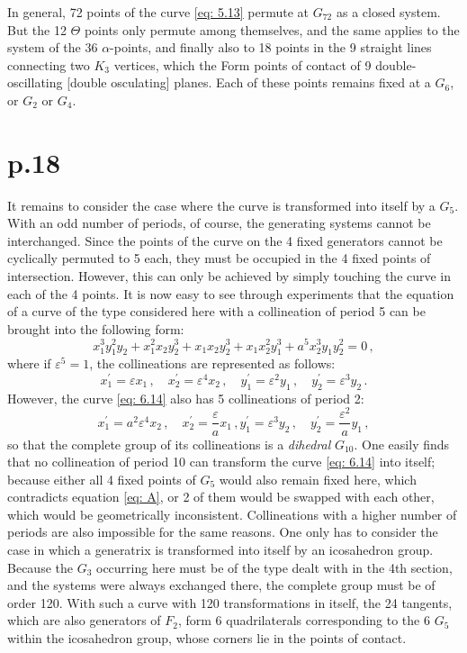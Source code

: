 \documentclass[leqno]{article}
\begin{document}
In general, 72 points of the curve \eqref{eq: 5.13} permute at $G_{72}$ as a closed system. But the 12 $\Theta$ points only permute among themselves, and the same applies to the system of the 36 $\alpha$-points, and finally also to 18 points in the 9 straight lines connecting two $K_3$ vertices, which the Form points of contact of 9 double-oscillating [double osculating] planes. Each of these points remains fixed at a $G_6$, or $G_2$ or $G_4$. 
\section{p.18}
It remains to consider the case where the curve is transformed into itself by a $G_5$. With an odd number of periods, of course, the generating systems cannot be interchanged. Since the points of the curve on the 4 fixed generators cannot be cyclically permuted to 5 each, they must be occupied in the 4 fixed points of intersection. However, this can only be achieved by simply touching the curve in each of the 4 points. It is now easy to see through experiments that the equation of a curve of the type considered here with a collineation of period 5 can be brought into the following form: 
\begin{equation}\label{eq: 6.14}
x_1^3 y_1^2 y_2 + x_1^2 x_2 y_2^3 + x_1 x_2 y_2^3 + x_1 x_2^2 y_1^3 + a^5 x_2^3 y_1 y_2^2 = 0 \, , \tag{14}
\end{equation}
where if $\varepsilon^5=1 $, the collineations are represented as follows:
\[
x_1^\prime = \varepsilon x_1 \, , \quad x_2^\prime = \varepsilon^4 x_2 \, , \quad y_1^\prime = \varepsilon^2 y_1 \, , \quad y_2^\prime = \varepsilon^3 y_2 \, . 
\]
However, the curve \eqref{eq: 6.14} also has 5 collineations of period 2: 
\[
x_1^\prime = a^2 \varepsilon^4 x_2 \, , \quad x_2^\prime = \frac{\varepsilon}{a} x_1 \, , y_1^\prime = \varepsilon^3 y_2 \, , \quad y_2^\prime = \frac{\varepsilon^2}{a} y_1 \, , 
\]
so that the complete group of its collineations is a \textit{dihedral} $G_{10}$. One easily finds that no collineation of period 10 can transform the curve \eqref{eq: 6.14} into itself; because either all 4 fixed points of $G_5$ would also remain fixed here, which contradicts equation \eqref{eq: A}, or 2 of them would be swapped with each other, which would be geometrically inconsistent. Collineations with a higher number of periods are also impossible for the same reasons. One only has to consider the case in which a generatrix is transformed into itself by an icosahedron group. Because the $G_3$ occurring here must be of the type dealt with in the 4th section, and the systems were always exchanged there, the complete group must be of order 120. With such a curve with 120 transformations in itself, the 24 tangents, which are also generators of $F_2$, form 6 quadrilaterals corresponding to the 6 $G_5$ within the icosahedron group, whose corners lie in the points of contact. \\
\end{document}
